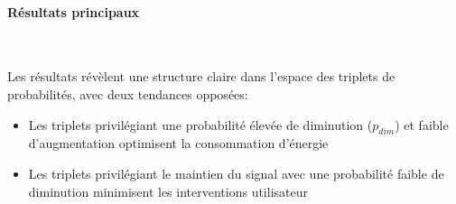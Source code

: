 



\paragraph{Résultats principaux} \

Les résultats révèlent une structure claire dans l'espace des triplets de probabilités, avec deux tendances opposées:

\begin{itemize}
    \item Les triplets privilégiant une probabilité élevée de diminution ($p_{dim}$) et faible d'augmentation optimisent la consommation d'énergie
    \item Les triplets privilégiant le maintien du signal avec une probabilité faible de diminution minimisent les interventions utilisateur
\end{itemize}

